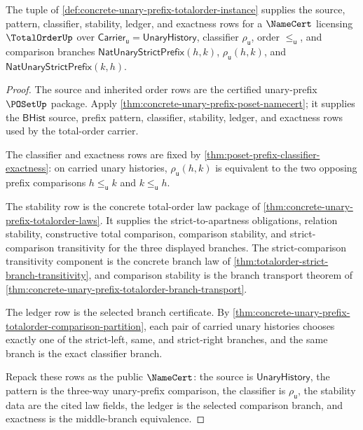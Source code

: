 \begin{theorem}
\label{thm:concrete-unary-prefix-totalorder-namecert}
The tuple of \autoref{def:concrete-unary-prefix-totalorder-instance} supplies
the source, pattern, classifier, stability, ledger, and exactness rows for a
$\NameCert$ licensing $\TotalOrderUp$ over
$\mathsf{Carrier}_{\mathsf{u}}=\mathsf{UnaryHistory}$, classifier
$\rho_{\mathsf{u}}$, order $\le_{\mathsf{u}}$, and comparison branches
$\mathsf{NatUnaryStrictPrefix}(h,k)$, $\rho_{\mathsf{u}}(h,k)$, and
$\mathsf{NatUnaryStrictPrefix}(k,h)$.
\end{theorem}
\begin{proof}
The source and inherited order rows are the certified unary-prefix $\POSetUp$
package. Apply \autoref{thm:concrete-unary-prefix-poset-namecert}; it supplies
the $\mathsf{BHist}$ source, prefix pattern, classifier, stability, ledger, and
exactness rows used by the total-order carrier.

The classifier and exactness rows are fixed by
\autoref{thm:poset-prefix-classifier-exactness}: on carried unary histories,
$\rho_{\mathsf{u}}(h,k)$ is equivalent to the two opposing prefix comparisons
$h\le_{\mathsf{u}}k$ and $k\le_{\mathsf{u}}h$.

The stability row is the concrete total-order law package of
\autoref{thm:concrete-unary-prefix-totalorder-laws}. It supplies the
strict-to-apartness obligations, relation stability, constructive total
comparison, comparison stability, and strict-comparison transitivity for the
three displayed branches. The strict-comparison transitivity component is the
concrete branch law of \autoref{thm:totalorder-strict-branch-transitivity}, and
comparison stability is the branch transport theorem of
\autoref{thm:concrete-unary-prefix-totalorder-branch-transport}.

The ledger row is the selected branch certificate. By
\autoref{thm:concrete-unary-prefix-totalorder-comparison-partition}, each pair
of carried unary histories chooses exactly one of the strict-left, same, and
strict-right branches, and the same branch is the exact classifier branch.

Repack these rows as the public $\NameCert$: the source is
$\mathsf{UnaryHistory}$, the pattern is the three-way unary-prefix comparison,
the classifier is $\rho_{\mathsf{u}}$, the stability data are the cited law
fields, the ledger is the selected comparison branch, and exactness is the
middle-branch equivalence.
\end{proof}

